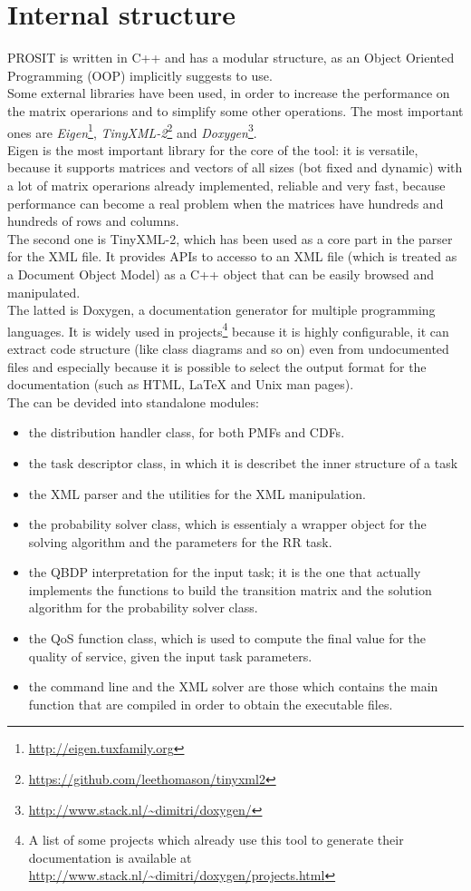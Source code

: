 \section{Internal structure}
PROSIT is written in C++ and has a modular structure, as an Object Oriented Programming (OOP) implicitly suggests to use.\\
Some external libraries have been used, in order to increase the performance on the matrix operarions and to simplify some other operations. The most important ones are \emph{Eigen}\footnote{\url{http://eigen.tuxfamily.org}}, \emph{TinyXML-2}\footnote{\url{https://github.com/leethomason/tinyxml2}} and \emph{Doxygen}\footnote{\url{http://www.stack.nl/~dimitri/doxygen/}}.\\   
Eigen is the most important library for the core of the tool: it is versatile, because it supports matrices and vectors of all sizes (bot fixed and dynamic) with a lot of matrix operarions already implemented, reliable and very fast, because performance can become a real problem when the matrices have hundreds and hundreds of rows and columns.\\
The second one is TinyXML-2, which has been used as a core part in the parser for the XML file. It provides APIs to accesso to an XML file (which is treated as a Document Object Model) as a C++ object that can be easily browsed and manipulated.\\
The latted is Doxygen, a documentation generator for multiple programming languages. It is widely used in projects\footnote{A list of some projects which already use this tool to generate their documentation is available at \url{http://www.stack.nl/~dimitri/doxygen/projects.html}} because it is highly configurable, it can extract code structure (like class diagrams and so on) even from undocumented files and especially because it is possible to select the output format for the documentation (such as HTML, {\LaTeX} and Unix man pages).\\
The can be devided into standalone modules:
\begin{itemize}
  \item the distribution handler class, for both PMFs and CDFs.
  \item the task descriptor class, in which it is describet the inner structure of a task
  \item the XML parser and the utilities for the XML manipulation.
  \item the probability solver class, which is essentialy a wrapper object for the solving algorithm and the parameters for the RR task.
  \item the QBDP interpretation for the input task; it is the one that actually implements the functions to build the transition matrix and the solution algorithm for the probability solver class.
  \item the QoS function class, which is used to compute the final value for the quality of service, given the input task parameters.
  \item the command line and the XML solver are those which contains the main function that are compiled in order to obtain the executable files.
\end{itemize}

